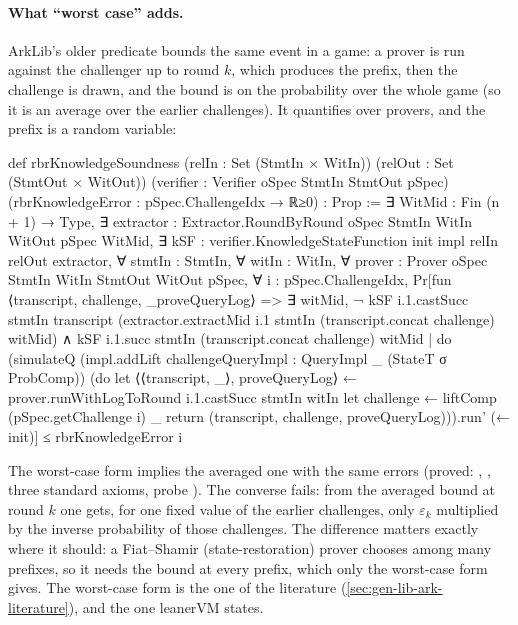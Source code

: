 \paragraph{What \enquote{worst case} adds.} ArkLib's older predicate 
bounds the same event in a game: a prover is run against the challenger up to round $k$, which
produces the prefix, then the challenge is drawn, and the bound is on the probability over the
whole game (so it is an average over the earlier challenges). It quantifies over provers, and the
prefix is a random variable:

\begin{leancode}
def rbrKnowledgeSoundness (relIn : Set (StmtIn × WitIn)) (relOut : Set (StmtOut × WitOut))
    (verifier : Verifier oSpec StmtIn StmtOut pSpec)
    (rbrKnowledgeError : pSpec.ChallengeIdx → ℝ≥0) : Prop :=
  ∃ WitMid : Fin (n + 1) → Type,
  ∃ extractor : Extractor.RoundByRound oSpec StmtIn WitIn WitOut pSpec WitMid,
  ∃ kSF : verifier.KnowledgeStateFunction init impl relIn relOut extractor,
  ∀ stmtIn : StmtIn,
  ∀ witIn : WitIn,
  ∀ prover : Prover oSpec StmtIn WitIn StmtOut WitOut pSpec,
  ∀ i : pSpec.ChallengeIdx,
    Pr[fun ⟨transcript, challenge, _proveQueryLog⟩ =>
      ∃ witMid,
        ¬ kSF i.1.castSucc stmtIn transcript
          (extractor.extractMid i.1 stmtIn (transcript.concat challenge) witMid) ∧
          kSF i.1.succ stmtIn (transcript.concat challenge) witMid
    | do
      (simulateQ (impl.addLift challengeQueryImpl : QueryImpl _ (StateT σ ProbComp))
        (do
          let ⟨⟨transcript, _⟩, proveQueryLog⟩ ← prover.runWithLogToRound i.1.castSucc stmtIn witIn
          let challenge ← liftComp (pSpec.getChallenge i) _
          return (transcript, challenge, proveQueryLog))).run' (← init)] ≤
      rbrKnowledgeError i
\end{leancode}


The worst-case form implies the averaged one with the same errors (proved:
\allowbreak{}\allowbreak{}\allowbreak{},
\allowbreak{}, three standard axioms, probe ). The
converse fails: from the averaged bound at round $k$ one gets, for one fixed value of the earlier
challenges, only $\varepsilon_k$ multiplied by the inverse probability of those challenges. The
difference matters exactly where it should: a Fiat--Shamir (state-restoration) prover chooses
among many prefixes, so it needs the bound at every prefix, which only the worst-case form gives.
The worst-case form is the one of the literature (\cref{sec:gen-lib-ark-literature}), and the one
leanerVM states.

